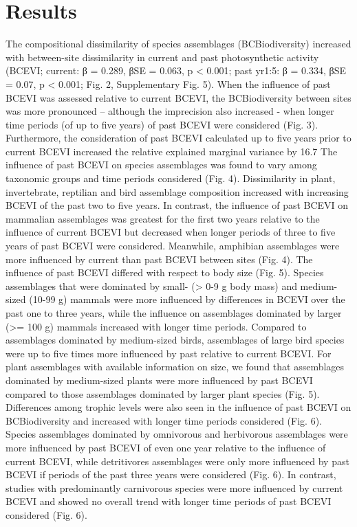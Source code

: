 \section{Results}
The compositional dissimilarity of species assemblages (BCBiodiversity) increased with between-site dissimilarity in current and past photosynthetic activity (BCEVI; current: β = 0.289, βSE = 0.063, p < 0.001; past yr1:5:  β = 0.334, βSE = 0.07, p < 0.001; Fig. 2, Supplementary Fig. 5). When the influence of past BCEVI was assessed relative to current BCEVI, the BCBiodiversity between sites was more pronounced – although the imprecision also increased - when longer time periods (of up to five years) of past BCEVI were considered (Fig. 3). Furthermore, the consideration of past BCEVI calculated up to five years prior to current BCEVI increased the relative explained marginal variance by 16.7 %
	The influence of past BCEVI on species assemblages was found to vary among taxonomic groups and time periods considered (Fig. 4). Dissimilarity in plant, invertebrate, reptilian and bird assemblage composition increased with increasing BCEVI of the past two to five years. In contrast, the influence of past BCEVI on mammalian assemblages was greatest for the first two years relative to the influence of current BCEVI but decreased when longer periods of three to five years of past BCEVI were considered. Meanwhile, amphibian assemblages were more influenced by current than past BCEVI between sites (Fig. 4).
	The influence of past BCEVI differed with respect to body size (Fig. 5). Species assemblages that were dominated by small- (> 0-9 g body mass) and medium-sized (10-99 g) mammals were more influenced by differences in BCEVI over the past one to three years, while the influence on assemblages dominated by larger (>= 100 g) mammals increased with longer time periods. Compared to assemblages dominated by medium-sized birds, assemblages of large bird species were up to five times more influenced by past relative to current BCEVI. For plant assemblages with available information on size, we found that assemblages dominated by medium-sized plants were more influenced by past BCEVI compared to those assemblages dominated by larger plant species (Fig. 5). 
	Differences among trophic levels were also seen in the influence of past BCEVI on BCBiodiversity and increased with longer time periods considered (Fig. 6). Species assemblages dominated by omnivorous and herbivorous assemblages were more influenced by past BCEVI of even one year relative to the influence of current BCEVI, while detritivores assemblages were only more influenced by past BCEVI if periods of the past three years were considered (Fig. 6). In contrast, studies with predominantly carnivorous species were more influenced by current BCEVI and showed no overall trend with longer time periods of past BCEVI considered (Fig. 6). 

